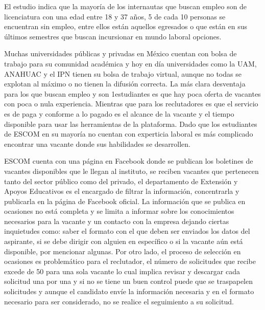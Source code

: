     El estudio indica que la mayoría de los internautas que buscan empleo son de licenciatura con una edad entre 18 y 37
    años, 5 de cada 10 personas se encuentran sin empleo, entre ellos están aquellos egresados o que están en sus últimos
    semestres que buscan incursionar en mundo laboral opciones.
    \newline

    Muchas universidades públicas y privadas en México cuentan con bolsa de trabajo para su comunidad académica y
    hoy en día universidades como la UAM, ANAHUAC y el IPN tienen su bolsa de trabajo virtual, aunque no todas se
    explotan al máximo o no tienen la difusión correcta. La más clara desventaja para los que buscan empleo y son
    1estudiantes es que hay poca oferta de vacantes con poca o nula experiencia. Mientras que para los reclutadores es que
    el servicio es de paga y conforme a lo pagado es el alcance de la vacante y el tiempo disponible para usar las
    herramientas de la plataforma. Dado que los estudiantes de ESCOM en su mayoría no cuentan con experticia laboral
    es más complicado encontrar una vacante donde sus habilidades se desarrollen. 

    ESCOM cuenta con una página en Facebook donde se publican los boletines de vacantes disponibles que le llegan al instituto, 
    se reciben vacantes que pertenecen tanto del sector público como del privado, el departamento de Extensión y Apoyos Educativos 
    es el encargado de filtrar la información, concentrarla y publicarla en la página de Facebook
    oficial.
    La información que se publica en ocasiones no está completa y se limita a informar sobre los conocimientos necesarios
    para la vacante y un contacto con la empresa dejando ciertas inquietudes como: saber el formato con el que deben ser
    enviados los datos del aspirante, si se debe dirigir con alguien en específico o si la vacante aún está disponible, por
    mencionar algunas.
    Por otro lado, el proceso de selección en ocasiones es problemático para el reclutador, el número de solicitudes que
    recibe excede de 50 para una sola vacante lo cual implica revisar y descargar cada solicitud una por una y si no se
    tiene un buen control puede que se traspapelen solicitudes y aunque el candidato envíe la información necesaria y en
    el formato necesario para ser considerado, no se realice el seguimiento a su solicitud.

